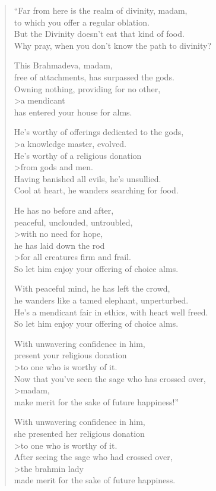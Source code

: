 \documentclass[12pt,openany]{book}%
\begin{document}
\begin{verse}%
“Far from here is the realm of divinity, madam, \\
to which you offer a regular oblation. \\
But the Divinity doesn’t eat that kind of food. \\
Why pray, when you don’t know the path to divinity? 

This Brahmadeva, madam, \\
free of attachments, has surpassed the gods. \\
Owning nothing, providing for no other, \\>a mendicant \\
has entered your house for alms. 

He’s worthy of offerings dedicated to the gods, \\>a knowledge master, evolved. \\
He’s worthy of a religious donation \\>from gods and men. \\
Having banished all evils, he’s unsullied. \\
Cool at heart, he wanders searching for food. 

He has no before and after, \\
peaceful, unclouded, untroubled, \\>with no need for hope, \\
he has laid down the rod \\>for all creatures firm and frail. \\
So let him enjoy your offering of choice alms. 

With peaceful mind, he has left the crowd, \\
he wanders like a tamed elephant, unperturbed. \\
He’s a mendicant fair in ethics, with heart well freed. \\
So let him enjoy your offering of choice alms. 

With unwavering confidence in him, \\
present your religious donation \\>to one who is worthy of it. \\
Now that you’ve seen the sage who has crossed over, \\>madam, \\
make merit for the sake of future happiness!” 

With unwavering confidence in him, \\
she presented her religious donation \\>to one who is worthy of it. \\
After seeing the sage who had crossed over, \\>the brahmin lady \\
made merit for the sake of future happiness. 

%
\end{verse}
\end{document}
